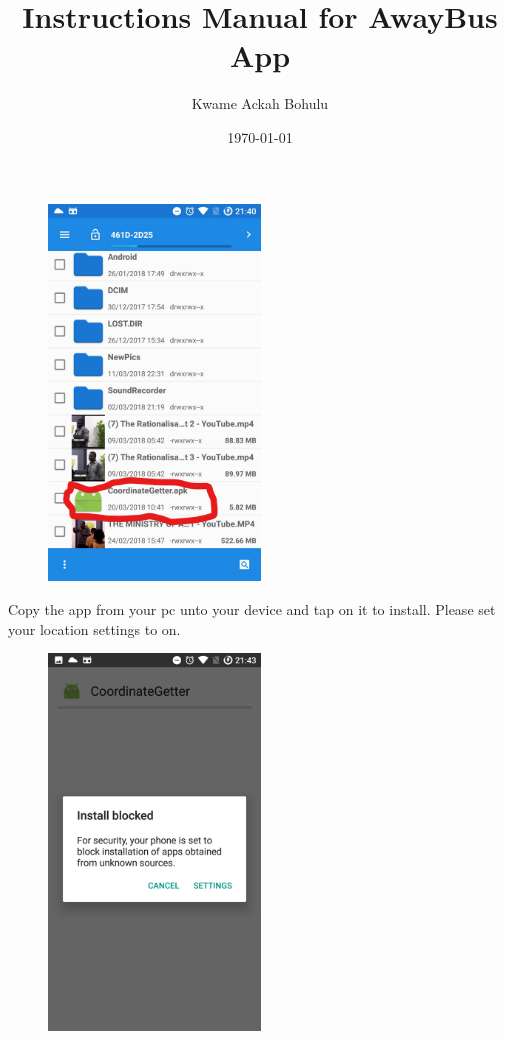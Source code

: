 \documentclass[fontsize=25pt]{scrbook}
\title{Instructions Manual for AwayBus App}
\author{Kwame Ackah Bohulu}
\date{\today}
\begin{document}
\maketitle

\newpage
\begin{center}
\begin{figure}
		\includegraphics[height=10cm]{Screenshot_1_LI.jpg}
		
		\end{figure}
	\end{center}
Copy the app from your pc unto your device and tap on it to install. Please set your location settings to on.
\newpage
\begin{center}
\begin{figure}
		\includegraphics[height=10cm]{Screenshot_2.png}
		
		\end{figure}
	\end{center}
\end{document}
